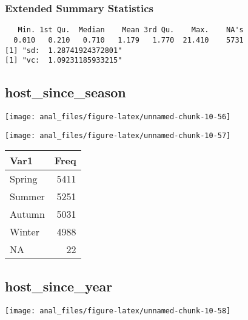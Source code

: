 \hypertarget{extended-summary-statistics-19}{%
\subsubsection{Extended Summary
Statistics}\label{extended-summary-statistics-19}}

\begin{verbatim}   Min. 1st Qu.  Median    Mean 3rd Qu.    Max.    NA's 
  0.010   0.210   0.710   1.179   1.770  21.410    5731 
[1] "sd:  1.28741924372801"
[1] "vc:  1.09231185933215"
\end{verbatim}

\pagebreak

\centering

\hypertarget{host_since_season}{%
\subsection{host\_since\_season}\label{host_since_season}}

\begin{center}\texttt{[image: anal\_files/figure-latex/unnamed-chunk-10-56]} \end{center}

\begin{center}\texttt{[image: anal\_files/figure-latex/unnamed-chunk-10-57]} \end{center}

\begin{table}[H]
\centering
\begin{tabular}[t]{lr}
\toprule
Var1 & Freq\\
\midrule
Spring & 5411\\
Summer & 5251\\
Autumn & 5031\\
Winter & 4988\\
NA & 22\\
\bottomrule
\end{tabular}
\end{table}
\pagebreak

\centering

\hypertarget{host_since_year}{%
\subsection{host\_since\_year}\label{host_since_year}}

\begin{center}\texttt{[image: anal\_files/figure-latex/unnamed-chunk-10-58]} \end{center}

